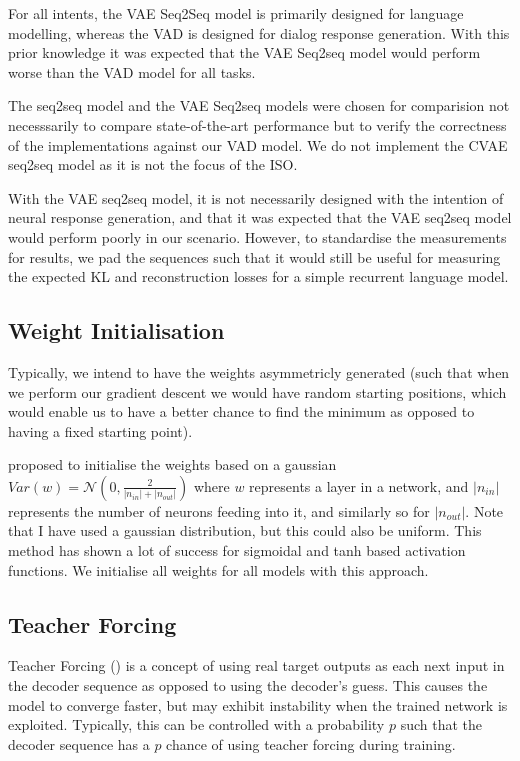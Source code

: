 \documentclass[12pt,twoside]{report}
\begin{document}
For all intents, the VAE Seq2Seq model is primarily designed for language modelling, whereas the VAD is designed for dialog response generation. With this prior knowledge it was expected that the VAE Seq2seq model would perform worse than the VAD model for all tasks.

The seq2seq model and the VAE Seq2seq models were chosen for comparision not necesssarily to compare state-of-the-art performance but to verify the correctness of the implementations against our VAD model. We do not implement the CVAE seq2seq model as it is not the focus of the ISO.

With the VAE seq2seq model, it is not necessarily designed with the intention of neural response generation, and that it was expected that the VAE seq2seq model would perform poorly in our scenario. However, to standardise the measurements for results, we pad the sequences such that it would still be useful for measuring the expected KL and reconstruction losses for a simple recurrent language model.

\subsection*{Weight Initialisation}

Typically, we intend to have the weights asymmetricly generated (such that when we perform our gradient descent we would have random starting positions, which would enable us to have a better chance to find the minimum as opposed to having a fixed starting point).

\cite{glorot_understanding_2010} proposed to initialise the weights based on a gaussian $Var(w)=\mathcal{N}(0,\frac{2}{|n_{in}| + |n_{out}| })$ where $w$ represents a layer in a network, and $|n_{in}|$ represents the number of neurons feeding into it, and similarly so for $|n_{out}|$. Note that I have used a gaussian distribution, but this could also be uniform. This method has shown a lot of success for sigmoidal and tanh based activation functions. We initialise all weights for all models with this approach.

\subsection*{Teacher Forcing}

Teacher Forcing (\cite{williams_learning_1989}) is a concept of using real target outputs as each next input in the decoder sequence as opposed to using the decoder's guess. This causes the model to converge faster, but may exhibit instability when the trained network is exploited. Typically, this can be controlled with a probability $p$ such that the decoder sequence has a $p$ chance of using teacher forcing during training.
\end{document}
